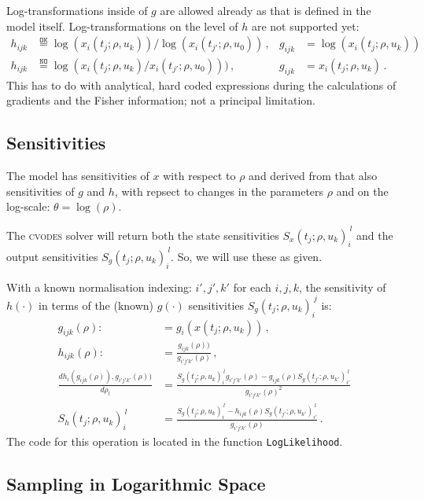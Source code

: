 \documentclass[utf8,english,DIV=12,12pt]{scrartcl}
\newcommand{\sens}[5][j]{\ensuremath{S_{#2}(t_{#1};\rho,u_{#5})_{#3}^{~#4}}}
\newcommand{\software}[1]{\textsc{#1}}
\begin{document}
Log-transformations inside of $g$ are allowed already as that is
defined in the model itself. Log-transformations on the level of $h$
are not supported yet:
\begin{align}
  h_{ijk}&\overset{\texttt{OK}}{=} \log(x_i(t_j;\rho,u_k))/\log(x_i(t_{j'};\rho,u_0))\,,& g_{ijk}&=\log(x_i(t_j;\rho,u_k))\\
  h_{ijk}&\overset{\texttt{NO}}{=} \log(x_i(t_j;\rho,u_k)/x_i(t_{j'};\rho,u_0)))\,,&g_{ijk}&=x_i(t_j;\rho,u_k)\,.
\end{align}
This has to do with analytical, hard coded expressions during the
calculations of gradients and the Fisher information; not a principal
limitation.

\subsection{Sensitivities}
\label{sec:sens}

The model has sensitivities of $x$ with respect to $\rho$ and derived
from that also sensitivities of $g$ and $h$, with repsect to changes
in the parameters $\rho$ and on the log-scale: $\theta=\log(\rho)$.

The \software{cvodes} solver will return both the state sensitivities
$\sens{x}{i}{l}{k}$ and the output sensitivities
$\sens{g}{i}{l}{k}$. So, we will use these as given.

With a known normalisation indexing: $i',j',k'$ for each $i,j,k$, the
sensitivity of $h(\cdot)$ in terms of the (known) $g(\cdot)$
sensitivities $\sens{g}{i}{j}{k}$ is:
\begin{align}
    g_{ijk}(\rho):&=g_i(x(t_j;\rho,u_k))\,,\\
    h_{ijk}(\rho):&=\frac{g_{ijk}(\rho))}{g_{i'j'k'}(\rho)}\,,\\
  \frac{d h_i(g_{ijk}(\rho)),g_{i'j'k'}(\rho))}{d \rho_l}
  &= \frac{\sens{g}{i}{l}{k} g_{i'j'k'}(\rho) -g_{ijk}(\rho) \sens[j']{g}{i'}{l}{k'}}{g_{i'j'k'}(\rho)^2}\nonumber\\
  \sens{h}{i}{l}{k}&= \frac{\sens{g}{i}{l}{k} 
    - h_{ijk}(\rho)\sens[j']{g}{i'}{l}{k'}}{g_{i'j'k'}(\rho)}\,.\label{eq:fyS}
\end{align}
The code for this
operation is located in the function \texttt{LogLikelihood}.

\subsection{Sampling in Logarithmic Space}
\label{sec:rho}
\end{document}
